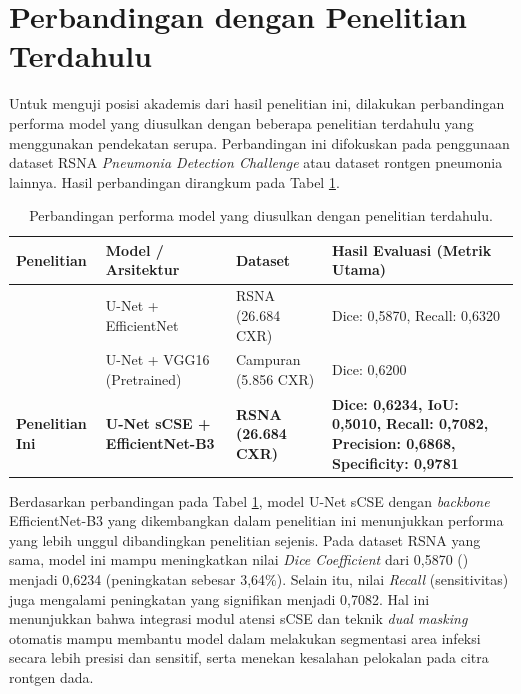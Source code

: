 \documentclass[12pt,a4paper,oneside]{book}
\begin{document}
\section{Perbandingan dengan Penelitian Terdahulu}

Untuk menguji posisi akademis dari hasil penelitian ini, dilakukan perbandingan performa model yang diusulkan dengan beberapa penelitian terdahulu yang menggunakan pendekatan serupa. Perbandingan ini difokuskan pada penggunaan dataset RSNA \textit{Pneumonia Detection Challenge} atau dataset rontgen pneumonia lainnya. Hasil perbandingan dirangkum pada Tabel \ref{tab:comparison_previous}.

\begin{table}[htbp]
  \centering
  \caption{Perbandingan performa model yang diusulkan dengan penelitian terdahulu.}
  \label{tab:comparison_previous}
  \begin{tabularx}{\textwidth}{llXX}
    \toprule
    \textbf{Penelitian} & \textbf{Model / Arsitektur} & \textbf{Dataset} & \textbf{Hasil Evaluasi (Metrik Utama)} \\
    \midrule
    \textcite{seth2022} & U-Net + EfficientNet & RSNA (26.684 CXR) & Dice: 0,5870, \newline Recall: 0,6320 \\
    \textcite{mallidi2024} & U-Net + VGG16 (Pretrained) & Campuran (5.856 CXR) & Dice: 0,6200 \\
    \textbf{Penelitian Ini} & \textbf{U-Net sCSE + EfficientNet-B3} & \textbf{RSNA (26.684 CXR)} & \textbf{Dice: 0,6234, IoU: 0,5010,} \newline \textbf{Recall: 0,7082, Precision: 0,6868,} \newline \textbf{Specificity: 0,9781} \\
    \bottomrule
  \end{tabularx}
\end{table}

Berdasarkan perbandingan pada Tabel \ref{tab:comparison_previous}, model U-Net sCSE dengan \textit{backbone} EfficientNet-B3 yang dikembangkan dalam penelitian ini menunjukkan performa yang lebih unggul dibandingkan penelitian sejenis. Pada dataset RSNA yang sama, model ini mampu meningkatkan nilai \textit{Dice Coefficient} dari 0,5870 (\textcite{seth2022}) menjadi 0,6234 (peningkatan sebesar 3,64\%). Selain itu, nilai \textit{Recall} (sensitivitas) juga mengalami peningkatan yang signifikan menjadi 0,7082. Hal ini menunjukkan bahwa integrasi modul atensi sCSE dan teknik \textit{dual masking} otomatis mampu membantu model dalam melakukan segmentasi area infeksi secara lebih presisi dan sensitif, serta menekan kesalahan pelokalan pada citra rontgen dada.
\end{document}
